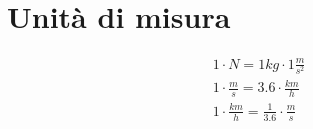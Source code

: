 \section{Unità di misura}

\begin{gather*}
1 \cdot N = 1kg \cdot 1 \frac{m}{s^2} \\
1 \cdot \frac{m}{s} = 3.6 \cdot \frac{km}{h} \\
1 \cdot \frac{km}{h} = \frac{1}{3.6} \cdot \frac{m}{s}
\end{gather*}